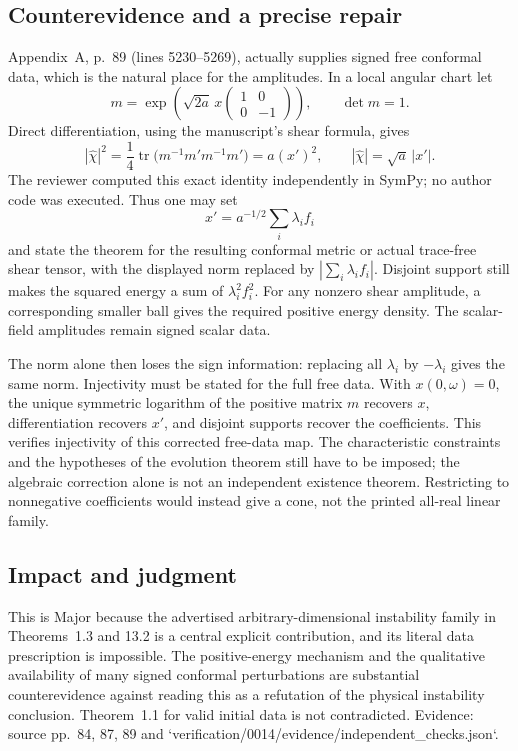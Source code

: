 \documentclass[10pt]{article}
\begin{document}
\subsection*{Counterevidence and a precise repair}
Appendix A, p. 89 (lines 5230–5269), actually supplies signed free conformal data, which is the natural place for the amplitudes. In a local angular chart let \[m=\exp\!\left(\sqrt{2a}\,x
       \begin{pmatrix}1&0\\0&-1\end{pmatrix}\right),\qquad \det m=1.\] Direct differentiation, using the manuscript’s shear formula, gives \[|\widehat\chi|^2
 =\frac14\operatorname{tr}\!\bigl(m^{-1}m'm^{-1}m'\bigr)=a(x')^2,\qquad
 |\widehat\chi|=\sqrt a\,|x'|.\] The reviewer computed this exact identity independently in SymPy; no author code was executed. Thus one may set \[x'=a^{-1/2}\sum_i\lambda_i f_i\] and state the theorem for the resulting conformal metric or actual trace-free shear tensor, with the displayed norm replaced by \(\left|\sum_i\lambda_i f_i\right|\). Disjoint support still makes the squared energy a sum of \(\lambda_i^2 f_i^2\). For any nonzero shear amplitude, a corresponding smaller ball gives the required positive energy density. The scalar-field amplitudes remain signed scalar data.\par
The norm alone then loses the sign information: replacing all \(\lambda_i\) by \(-\lambda_i\) gives the same norm. Injectivity must be stated for the full free data. With \(x(0,\omega)=0\), the unique symmetric logarithm of the positive matrix \(m\) recovers \(x\), differentiation recovers \(x'\), and disjoint supports recover the coefficients. This verifies injectivity of this corrected free-data map. The characteristic constraints and the hypotheses of the evolution theorem still have to be imposed; the algebraic correction alone is not an independent existence theorem. Restricting to nonnegative coefficients would instead give a cone, not the printed all-real linear family.\par
\subsection*{Impact and judgment}
This is Major because the advertised arbitrary-dimensional instability family in Theorems 1.3 and 13.2 is a central explicit contribution, and its literal data prescription is impossible. The positive-energy mechanism and the qualitative availability of many signed conformal perturbations are substantial counterevidence against reading this as a refutation of the physical instability conclusion. Theorem 1.1 for valid initial data is not contradicted. Evidence: source pp. 84, 87, 89 and `verification/0014/evidence/independent\_checks.json`.\par
\end{document}
